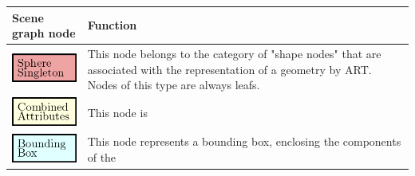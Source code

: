 \begin{table}
  \centering
  {\footnotesize
    \begin{tabular}{m{3cm}m{8cm}}
      \toprule
      Scene graph node & Function  \\
      \midrule
      \includegraphics[scale=0.5]{img/2 art/shape_node.png} & This node belongs
                                                              to the category of
                                                              "shape nodes" that
                                                              are associated
                                                              with the
                                                              representation of
                                                              a geometry by
                                                              ART. Nodes of this
                                                              type are always
                                                              leafs.\\
      \midrule
      \includegraphics[scale=0.5]{img/2 art/comb_attr_node.png} & This node is
      \\
      \midrule
    \includegraphics[scale=0.5]{img/2 art/bounding_box.png} & This node
                                                                       represents
                                                                       a
                                                                       bounding
                                                                       box,
                                                                       enclosing
                                                                       the
                                                                       components
                                                                       of the

\end{tabular}}
\end{table}

